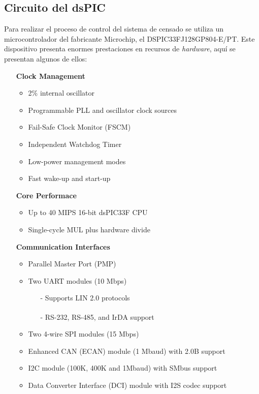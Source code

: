 \documentclass[11pt,a4paper,oneside]{article}
\begin{document}
\subsection{Circuito del dsPIC\textsuperscript{\textregistered}}
\label{sec:circ-dspic}

Para realizar el proceso de control del sistema de censado se utiliza un microcontrolador del fabricante Microchip, el DSPIC33FJ128GP804-E/PT. Este dispositivo presenta enormes prestaciones en recursos de \textsl{hardware}, aquí se presentan algunos de ellos:

\begin{itemize}

\item [] \textbf{Clock Management}
  \begin{itemize}
  \item  2\% internal oscillator                        
  \item  Programmable PLL and oscillator clock sources 
  \item  Fail-Safe Clock Monitor (FSCM)                
  \item  Independent Watchdog Timer                    
  \item  Low-power management modes                    
  \item  Fast wake-up and start-up                     
  \end{itemize}

\item [] \textbf{Core Performace}
  \begin{itemize}
  \item  Up to 40 MIPS 16-bit dsPIC33F CPU    
  \item  Single-cycle MUL plus hardware divide
  \end{itemize}

\item [] \textbf{Communication Interfaces}
  \begin{itemize}
  \item  Parallel Master Port (PMP)                                  
  \item  Two UART modules (10 Mbps)
    \begin{itemize}
    \item [-] Supports LIN 2.0 protocols                              
    \item [-] RS-232, RS-485, and IrDA\textsuperscript{\textregistered} support                       
    \end{itemize}
  \item  Two 4-wire SPI modules (15 Mbps)                            
  \item  Enhanced CAN (ECAN) module (1 Mbaud) with 2.0B support      
  \item  I2C module (100K, 400K and 1Mbaud) with SMbus support       
  \item  Data Converter Interface (DCI) module with I2S codec support
\end{itemize}


\end{itemize}
\end{document}
